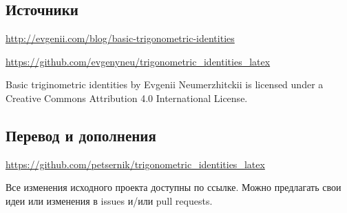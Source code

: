 \subsection*{Источники}

\url{http://evgenii.com/blog/basic-trigonometric-identities}

\url{https://github.com/evgenyneu/trigonometric_identities_latex}

Basic triginometric identities by Evgenii Neumerzhitckii is licensed under a Creative Commons Attribution 4.0 International License.

\subsection*{Перевод и дополнения}

\url{https://github.com/petsernik/trigonometric_identities_latex}

Все изменения исходного проекта доступны по ссылке. Можно предлагать свои идеи или изменения в issues и/или pull requests.